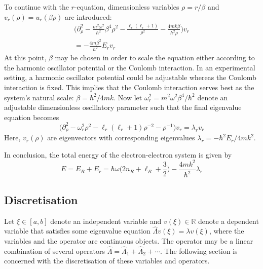 \documentclass[reprint,english]{revtex4-1}
\begin{document}
To continue with the \(r\)-equation, dimensionless variables \(\rho=r/\beta\) and \(v_r(\rho)=u_r(\beta\rho)\) are introduced:
\begin{align*}
\bigg(\partial_\rho^2-\frac{m^2\omega^2}{\hbar^2}\beta^4\rho^2-\frac{\ell_r(\ell_r+1)}{\rho^2}-\frac{4mk\beta}{\hbar^2\rho}\bigg)v_r\\=-\frac{4m\beta^2}{\hbar^2}E_rv_r
\end{align*}
At this point, \(\beta\) may be chosen in order to scale the equation either according to the harmonic oscillator potential or the Coulomb interaction. In an experimental setting, a harmonic oscillator potential could be adjustable whereas the Coulomb interaction is fixed. This implies that the Coulomb interaction serves best as the system's natural scale: \(\beta=\hbar^2/4mk\). Now let \(\omega_r^2=m^2\omega^2\beta^4/\hbar^2\) denote an adjustable dimensionless oscillatory parameter such that the final eigenvalue equation becomes
\begin{equation}\label{eq:dimless_two_particle_interaction}
\Big(\partial_\rho^2-\omega_r^2\rho^2-\ell_r(\ell_r+1)\rho^{-2}-\rho^{-1}\Big)v_r=\lambda_rv_r
\end{equation}
Here, \(v_r(\rho)\) are eigenvectors with corresponding eigenvalues \(\lambda_r=-\hbar^2E_r/4mk^2\).

In conclusion, the total energy of the electron-electron system is given by
\begin{equation}
E=E_R+E_r=\hbar\omega\bigg(2n_R+\ell_R+\frac{3}{2}\bigg)-\frac{4mk^2}{\hbar^2}\lambda_r
\end{equation}

\subsection{Discretisation}
Let \(\xi\in[a,b]\) denote an independent variable and \(v(\xi)\in\mathbb{R}\) denote a dependent variable that satisfies some eigenvalue equation \(\hat{\Lambda} v(\xi)=\lambda v(\xi)\), where the variables and the operator are continuous objects. The operator may be a linear combination of several operators \(\hat{\Lambda}=\hat{\Lambda}_1+\hat{\Lambda}_2+\cdots\). The following section is concerned with the discretisation of these variables and operators.
\end{document}

